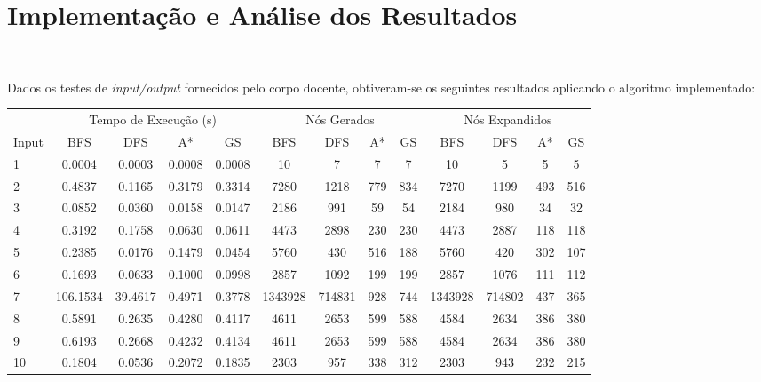 \documentclass[12pt]{exam}
\renewcommand\_{\textunderscore\linebreak[1]}
\begin{document}
    \section{Implementação e Análise dos Resultados}~

        \indent Dados os testes de \textit{input/output} fornecidos pelo corpo docente, obtiveram-se os seguintes resultados aplicando o algoritmo implementado:\\

        \begin{adjustbox}{width={\textwidth}, totalheight={\textheight}, keepaspectratio}
        \begin{tabular}{l cccc cccc cccc}
        \toprule
         & \multicolumn{4}{c}{Tempo de Execução (s)} & \multicolumn{4}{c}{Nós Gerados} & \multicolumn{4}{c}{Nós Expandidos}\\
        \cmidrule(lr){2-5} \cmidrule(lr){6-9} \cmidrule(lr){10-13}
        Input           & BFS  & DFS  & A* & GS       & BFS  & DFS  & A* & GS        & BFS  & DFS  & A* & GS \\
        \midrule
        1               & 0.0004 & 0.0003  & 0.0008    & 0.0008            & 10    & 7 & 7    & 7       & 10   & 5   & 5      &5  \\
        2               & 0.4837 & 0.1165  & 0.3179    & 0.3314            & 7280  & 1218 & 779  & 834       & 7270   & 1199   & 493    &516  \\
        3               & 0.0852 & 0.0360  & 0.0158    & 0.0147            & 2186  & 991 & 59   & 54       & 2184   & 980   & 34     &32  \\
        4               & 0.3192 & 0.1758  & 0.0630    & 0.0611            & 4473  & 2898 & 230  & 230       & 4473   & 2887   & 118    &118  \\
        5               & 0.2385 & 0.0176  & 0.1479    & 0.0454            & 5760  & 430 & 516  & 188       & 5760   & 420   & 302    &107  \\
        6               & 0.1693 & 0.0633  & 0.1000    & 0.0998            & 2857  & 1092 & 199  & 199       & 2857   & 1076   & 111    &112  \\
        7             & 106.1534 & 39.4617  & 0.4971    & 0.3778         & 1343928  & 714831 & 928  & 744       & 1343928   & 714802   & 437    &365  \\
        8               & 0.5891 & 0.2635  & 0.4280    & 0.4117            & 4611  & 2653 & 599  & 588       & 4584   & 2634   & 386    &380  \\
        9               & 0.6193 & 0.2668  & 0.4232    & 0.4134            & 4611  & 2653 & 599  & 588       & 4584   & 2634   & 386    &380  \\
        10              & 0.1804 & 0.0536  & 0.2072    & 0.1835            & 2303  & 957 & 338  & 312       & 2303   & 943   & 232    &215  \\
        \bottomrule
        \end{tabular}
        \end{adjustbox} \\
\end{document}
